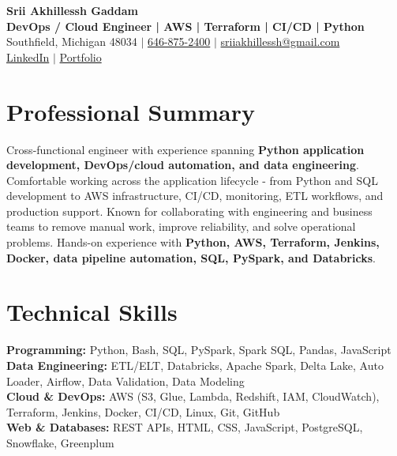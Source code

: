 \documentclass[letterpaper,10pt]{article}
\begin{document}
\fontsize{9.35pt}{10.45pt}\selectfont

\begin{center}
    {\LARGE \textbf{Srii Akhillessh Gaddam}} \\[-1pt]
    \textbf{DevOps / Cloud Engineer | AWS | Terraform | CI/CD | Python} \\[2pt]
    Southfield, Michigan 48034 $|$
    \href{tel:6468752400}{646-875-2400} $|$
    \href{mailto:sriiakhillessh@gmail.com}{sriiakhillessh@gmail.com} \\[1pt]
    \href{https://www.linkedin.com/in/srii-akhiilessh-gaddam-b48668191/}{LinkedIn} $|$
    \href{https://sriiakhillesshg.github.io/portfolio/}{Portfolio}
\end{center}
\vspace{-8pt}

\section{Professional Summary}
\small{Cross-functional engineer with experience spanning \textbf{Python application development, DevOps/cloud automation, and data engineering}. Comfortable working across the application lifecycle - from Python and SQL development to AWS infrastructure, CI/CD, monitoring, ETL workflows, and production support. Known for collaborating with engineering and business teams to remove manual work, improve reliability, and solve operational problems. Hands-on experience with \textbf{Python, AWS, Terraform, Jenkins, Docker, data pipeline automation, SQL, PySpark, and Databricks}.}

\section{Technical Skills}
\small{
\textbf{Programming:} Python, Bash, SQL, PySpark, Spark SQL, Pandas, JavaScript \\
\textbf{Data Engineering:} ETL/ELT, Databricks, Apache Spark, Delta Lake, Auto Loader, Airflow, Data Validation, Data Modeling \\
\textbf{Cloud \& DevOps:} AWS (S3, Glue, Lambda, Redshift, IAM, CloudWatch), Terraform, Jenkins, Docker, CI/CD, Linux, Git, GitHub \\
\textbf{Web \& Databases:} REST APIs, HTML, CSS, JavaScript, PostgreSQL, Snowflake, Greenplum
}
\end{document}
